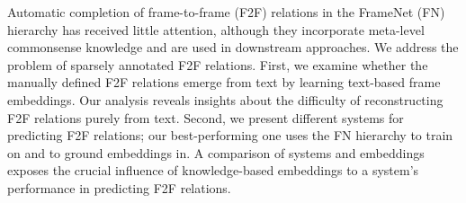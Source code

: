 Automatic completion of frame-to-frame (F2F) relations in the FrameNet (FN) hierarchy has received little attention, although they incorporate meta-level commonsense knowledge and are used in downstream approaches. We address the problem of sparsely annotated F2F relations. First, we examine whether the manually defined F2F relations emerge from text by learning text-based frame embeddings. Our analysis reveals insights about the difficulty of reconstructing F2F relations purely from text. Second, we present different systems for predicting F2F relations; our best-performing one uses the FN hierarchy to train on and to ground embeddings in. A comparison of systems and embeddings exposes the crucial influence of knowledge-based embeddings to a system's performance in predicting F2F relations.
